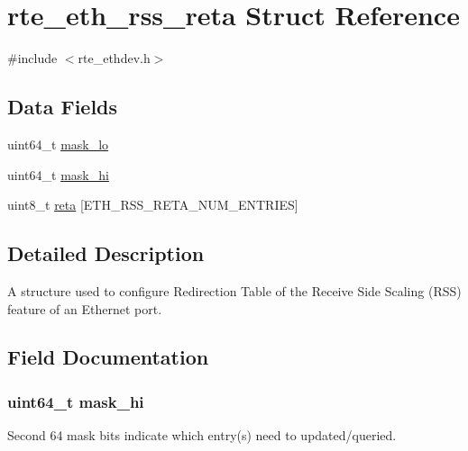 \hypertarget{structrte__eth__rss__reta}{}\section{rte\+\_\+eth\+\_\+rss\+\_\+reta Struct Reference}
\label{structrte__eth__rss__reta}


{\ttfamily \#include $<$rte\+\_\+ethdev.\+h$>$}

\subsection*{Data Fields}
\begin{DoxyCompactItemize}
\item 
uint64\+\_\+t \hyperlink{structrte__eth__rss__reta_a58e9ef082eae235a9368b0b9cf930b02}{mask\+\_\+lo}
\item 
uint64\+\_\+t \hyperlink{structrte__eth__rss__reta_a7570fc931ca6325f1d8fea0a1779a53b}{mask\+\_\+hi}
\item 
uint8\+\_\+t \hyperlink{structrte__eth__rss__reta_a2bd3f48a0cc83dacf87909d96866e01d}{reta} \mbox{[}E\+T\+H\+\_\+\+R\+S\+S\+\_\+\+R\+E\+T\+A\+\_\+\+N\+U\+M\+\_\+\+E\+N\+T\+R\+I\+E\+S\mbox{]}
\end{DoxyCompactItemize}


\subsection{Detailed Description}
A structure used to configure Redirection Table of the Receive Side Scaling (R\+S\+S) feature of an Ethernet port. 

\subsection{Field Documentation}
\hypertarget{structrte__eth__rss__reta_a7570fc931ca6325f1d8fea0a1779a53b}{}
\subsubsection[{mask\+\_\+hi}]{\setlength{\rightskip}{0pt plus 5cm}uint64\+\_\+t mask\+\_\+hi}\label{structrte__eth__rss__reta_a7570fc931ca6325f1d8fea0a1779a53b}
Second 64 mask bits indicate which entry(s) need to updated/queried. \hypertarget{structrte__eth__rss__reta_a58e9ef082eae235a9368b0b9cf930b02}{}
